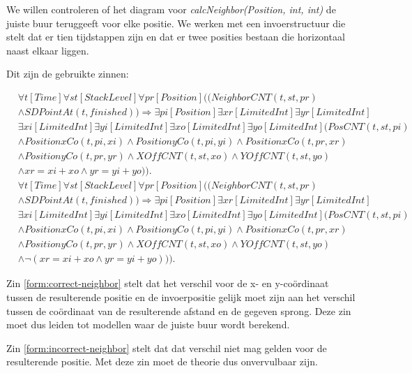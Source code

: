 We willen controleren of het diagram voor \textit{calcNeighbor(Position, int, int)} de juiste buur teruggeeft voor elke positie. We werken met een invoerstructuur die stelt dat er tien tijdstappen zijn en dat er twee posities bestaan die horizontaal naast elkaar liggen.

Dit zijn de gebruikte zinnen:

\begin{align}
	\nonumber&\forall{t}[Time]\forall{st}[StackLevel]\forall{pr}[Position]((NeighborCNT(t, st, pr) \\ \nonumber &\land SDPointAt(t, finished)) \Rightarrow \exists{pi}[Position]\exists{xr}[LimitedInt]\exists{yr}[LimitedInt]\\ \nonumber &\exists{xi}[LimitedInt]\exists{yi}[LimitedInt]\exists{xo}[LimitedInt]\exists{yo}[LimitedInt](PosCNT(t, st, pi) \\ \nonumber &\land PositionxCo(t, pi, xi) \land PositionyCo(t, pi, yi) \land PositionxCo(t, pr, xr) \\ \nonumber &\land PositionyCo(t, pr, yr) \land XOffCNT(t, st, xo) \land YOffCNT(t, st, yo) \\ &\land xr = xi + xo \land yr = yi + yo)).\label{form:correct-neighbor} \\
	\nonumber&\forall{t}[Time]\forall{st}[StackLevel]\forall{pr}[Position]((NeighborCNT(t, st, pr) \\ \nonumber &\land SDPointAt(t, finished)) \Rightarrow \exists{pi}[Position]\exists{xr}[LimitedInt]\exists{yr}[LimitedInt]\\ \nonumber &\exists{xi}[LimitedInt]\exists{yi}[LimitedInt]\exists{xo}[LimitedInt]\exists{yo}[LimitedInt](PosCNT(t, st, pi) \\ \nonumber &\land PositionxCo(t, pi, xi) \land PositionyCo(t, pi, yi) \land PositionxCo(t, pr, xr) \\ \nonumber &\land PositionyCo(t, pr, yr) \land XOffCNT(t, st, xo) \land YOffCNT(t, st, yo) \\ &\land \lnot{}(xr = xi + xo \land yr = yi + yo))).\label{form:incorrect-neighbor}
\end{align} 

Zin \ref{form:correct-neighbor} stelt dat het verschil voor de x- en y-co\"ordinaat tussen de resulterende positie en de invoerpositie gelijk moet zijn aan het verschil tussen de co\"ordinaat van de resulterende afstand en de gegeven sprong. Deze zin moet dus leiden tot modellen waar de juiste buur wordt berekend.

Zin \ref{form:incorrect-neighbor} stelt dat dat verschil niet mag gelden voor de resulterende positie. Met deze zin moet de theorie dus onvervulbaar zijn.

